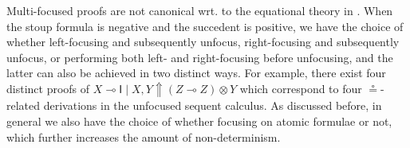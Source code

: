 \documentclass[runningheads]{llncs}
\newcommand{\tr}{\otimes \mathsf{R}}
\newcommand{\otR}{\tr}
\newcommand{\ot}{\otimes}
\newcommand{\lolli}{\multimap}
\newcommand{\I}{\mathsf{I}}
\newcommand{\up}{\Uparrow}
\begin{document}
Multi-focused proofs are not canonical wrt. to the equational theory in . When the stoup formula is negative and the succedent is positive, we have the choice of whether left-focusing and subsequently unfocus, right-focusing and subsequently unfocus, or performing both left- and right-focusing before unfocusing, and the latter can also be achieved in two distinct ways.
For example, there exist four distinct proofs of $X \lolli \I \mid X , Y \up (Z \lolli Z) \ot Y$ which correspond to four $\circeq$-related derivations in the unfocused sequent calculus.
As discussed before, in general we also have the choice of whether focusing on atomic formulae or not, which further increases the amount of non-determinism. %
\end{document}
